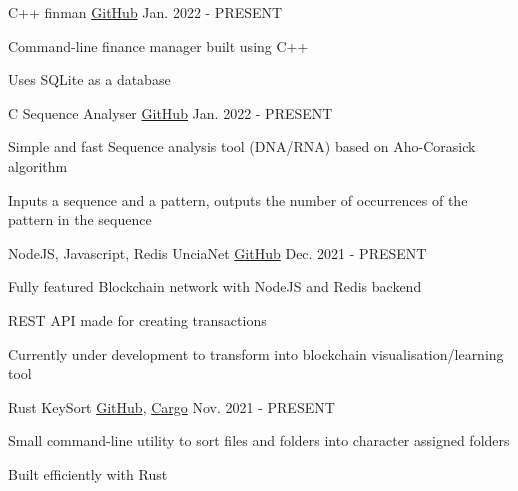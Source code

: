 \usepackage{hyperref}%


\begin{cventries}


  \cventry
  {C++}
  {finman}
  {\href{https://github.com/UnciaBit/finman}{GitHub}} %
  {Jan. 2022 - PRESENT}
  {
    \begin{cvitems}
      \item {Command-line finance manager built using C++}
      \item {Uses SQLite as a database}
    \end{cvitems}
  }

  \cventry
  {C}
  {Sequence Analyser}
  {\href{https://github.com/UnciaBit/Sequence-Analysis}{GitHub}} %
  {Jan. 2022 - PRESENT}
  {
    \begin{cvitems}
      \item {Simple and fast Sequence analysis tool (DNA/RNA) based on Aho-Corasick algorithm}
      \item {Inputs a sequence and a pattern, outputs the number of occurrences of the pattern in the sequence}
    \end{cvitems}
  }



  \cventry
  {NodeJS, Javascript, Redis}
  {UnciaNet}
  {\href{https://github.com/UnciaBit/UnciaNet-FE}{GitHub}} %
  {Dec. 2021 - PRESENT}
  {
    \begin{cvitems}
      \item {Fully featured Blockchain network with NodeJS and Redis backend}
      \item {REST API made for creating transactions}
      \item {Currently under development to transform into blockchain visualisation/learning tool}
    \end{cvitems}
  }


  \cventry
    {Rust} 
    {KeySort} 
    {\href{https://github.com/UnciaBit/KeySort-cli}{GitHub}, \href{https://crates.io/crates/keysort}{Cargo}} %
    {Nov. 2021 - PRESENT} 
    {
      \begin{cvitems}
        \item {Small command-line utility to sort files and folders into character assigned folders}
        \item {Built efficiently with Rust}
      \end{cvitems}
    }


\end{cventries}

